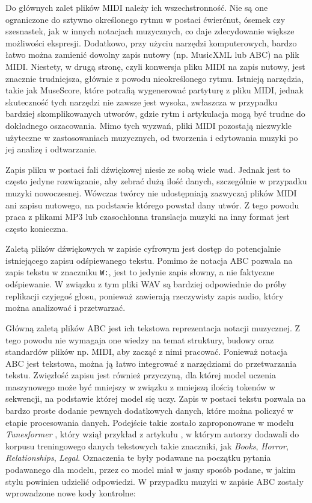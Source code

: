 \documentclass[data-science]{agh-wi} %
\begin{document}
Do głównych zalet plików MIDI należy ich wszechstronność. Nie są one ograniczone do sztywno określonego rytmu w postaci ćwierćnut, ósemek czy szesnastek, jak w innych notacjach muzycznych, co daje zdecydowanie większe możliwości ekspresji. Dodatkowo, przy użyciu narzędzi komputerowych, bardzo łatwo można zamienić dowolny zapis nutowy (np. MusicXML lub ABC) na plik MIDI. Niestety, w drugą stronę, czyli konwersja pliku MIDI na zapis nutowy, jest znacznie trudniejsza, głównie z powodu nieokreślonego rytmu. Istnieją narzędzia, takie jak MuseScore, które potrafią wygenerować partyturę z pliku MIDI, jednak skuteczność tych narzędzi nie zawsze jest wysoka, zwłaszcza w przypadku bardziej skomplikowanych utworów, gdzie rytm i artykulacja mogą być trudne do dokładnego oszacowania. Mimo tych wyzwań, pliki MIDI pozostają niezwykle użyteczne w zastosowaniach muzycznych, od tworzenia i edytowania muzyki po jej analizę i odtwarzanie.

Zapis pliku w postaci fali dźwiękowej niesie ze sobą wiele wad. Jednak jest to często jedyne rozwiązanie, aby zebrać dużą ilość danych, szczególnie w przypadku muzyki nowoczesnej. Wówczas twórcy nie udostępniają zazwyczaj plików MIDI ani zapisu nutowego, na podstawie którego powstał dany utwór. Z tego powodu praca z plikami MP3 lub czasochłonna translacja muzyki na inny format jest często konieczna.

Zaletą plików dźwiękowych w zapisie cyfrowym jest dostęp do potencjalnie istniejącego zapisu odśpiewanego tekstu. Pomimo że notacja ABC pozwala na zapis tekstu w znaczniku \texttt{W:}, jest to jedynie zapis słowny, a nie faktyczne odśpiewanie. W związku z tym pliki WAV są bardziej odpowiednie do próby replikacji czyjegoś głosu, ponieważ zawierają rzeczywisty zapis audio, który można analizować i przetwarzać.

Główną zaletą plików ABC jest ich tekstowa reprezentacja notacji muzycznej. Z tego powodu nie wymagaja one wiedzy na temat struktury, budowy oraz standardów plików np. MIDI, aby zacząć z nimi pracować. Ponieważ notacja ABC jest tekstowa, można ją łatwo integrować z narzędziami do przetwarzania tekstu. Zwięzłość zapisu jest również przyczyną, dla której model uczenia maszynowego może być mniejszy w związku z mniejszą ilością tokenów w sekwencji, na podstawie której model się uczy. Zapis w postaci tekstu pozwala na bardzo proste dodanie pewnych dodatkowych danych, które można policzyć w etapie procesowania danych. Podejście takie zostało zaproponowane w modelu \textit{Tunesformer} \cite{tunesformer}, który wziął przykład z artykułu \cite{keskarCTRL2019}, w którym autorzy dodawali do korpusu treningowego danych tekstowych takie znaczniki, jak \textit{Books}, \textit{Horror}, \textit{Relationships}, \textit{Legal}. Oznaczenia te były podawane na początku pytania podawanego dla modelu, przez co model miał w jasny sposób podane, w jakim stylu powinien udzielić odpowiedzi. W przypadku muzyki w zapisie ABC zostały wprowadzone nowe kody kontrolne:
\end{document}
